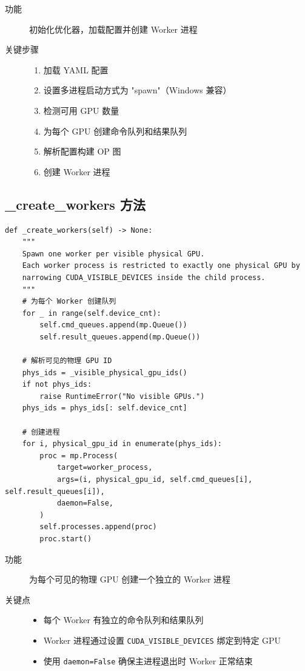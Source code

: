 \documentclass[12pt,a4paper]{article}
\begin{document}
\begin{description}
    \item[功能] 初始化优化器，加载配置并创建 Worker 进程
    \item[关键步骤]
    \begin{enumerate}
        \item 加载 YAML 配置
        \item 设置多进程启动方式为 "spawn"（Windows 兼容）
        \item 检测可用 GPU 数量
        \item 为每个 GPU 创建命令队列和结果队列
        \item 解析配置构建 OP 图
        \item 创建 Worker 进程
    \end{enumerate}
\end{description}

\subsection{\_create\_workers 方法}

\begin{lstlisting}
def _create_workers(self) -> None:
    """
    Spawn one worker per visible physical GPU.
    Each worker process is restricted to exactly one physical GPU by
    narrowing CUDA_VISIBLE_DEVICES inside the child process.
    """
    # 为每个 Worker 创建队列
    for _ in range(self.device_cnt):
        self.cmd_queues.append(mp.Queue())
        self.result_queues.append(mp.Queue())
    
    # 解析可见的物理 GPU ID
    phys_ids = _visible_physical_gpu_ids()
    if not phys_ids:
        raise RuntimeError("No visible GPUs.")
    phys_ids = phys_ids[: self.device_cnt]
    
    # 创建进程
    for i, physical_gpu_id in enumerate(phys_ids):
        proc = mp.Process(
            target=worker_process,
            args=(i, physical_gpu_id, self.cmd_queues[i], self.result_queues[i]),
            daemon=False,
        )
        self.processes.append(proc)
        proc.start()
\end{lstlisting}

\begin{description}
    \item[功能] 为每个可见的物理 GPU 创建一个独立的 Worker 进程
    \item[关键点]
    \begin{itemize}
        \item 每个 Worker 有独立的命令队列和结果队列
        \item Worker 进程通过设置 \texttt{CUDA\_VISIBLE\_DEVICES} 绑定到特定 GPU
        \item 使用 \texttt{daemon=False} 确保主进程退出时 Worker 正常结束
    \end{itemize}
\end{description}
\end{document}

